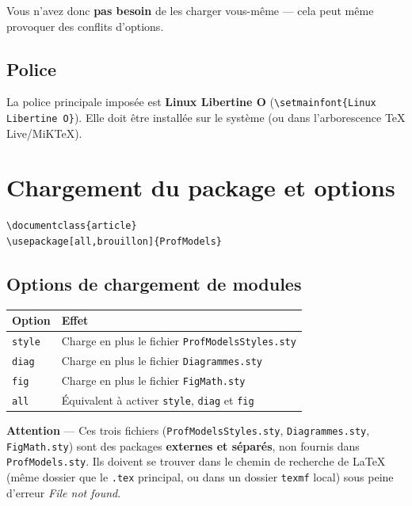 \documentclass[11pt,a4paper]{article}
\newcommand{\cmdname}[1]{\texttt{\textbackslash#1}}
\begin{document}
Vous n'avez donc \textbf{pas besoin} de les charger vous-même — cela peut même provoquer des conflits d'options.

\subsection{Police}

La police principale imposée est \textbf{Linux Libertine O} (\cmdname{setmainfont\{Linux Libertine O\}}). Elle doit être installée sur le système (ou dans l'arborescence TeX Live/MiKTeX).

\section{Chargement du package et options}

\begin{lstlisting}
\documentclass{article}
\usepackage[all,brouillon]{ProfModels}
\end{lstlisting}

\subsection{Options de chargement de modules}

\begin{center}
\begin{tabular}{@{}ll@{}}
\toprule
\textbf{Option} & \textbf{Effet} \\
\midrule
\texttt{style} & Charge en plus le fichier \texttt{ProfModelsStyles.sty} \\
\texttt{diag}  & Charge en plus le fichier \texttt{Diagrammes.sty} \\
\texttt{fig}   & Charge en plus le fichier \texttt{FigMath.sty} \\
\texttt{all}   & Équivalent à activer \texttt{style}, \texttt{diag} et \texttt{fig} \\
\bottomrule
\end{tabular}
\end{center}

\begin{avertissement}
\textbf{Attention} — Ces trois fichiers (\texttt{ProfModelsStyles.sty}, \texttt{Diagrammes.sty}, \texttt{FigMath.sty}) sont des packages \textbf{externes et séparés}, non fournis dans \texttt{ProfModels.sty}. Ils doivent se trouver dans le chemin de recherche de LaTeX (même dossier que le \texttt{.tex} principal, ou dans un dossier \texttt{texmf} local) sous peine d'erreur \textit{File not found}.
\end{avertissement}
\end{document}
